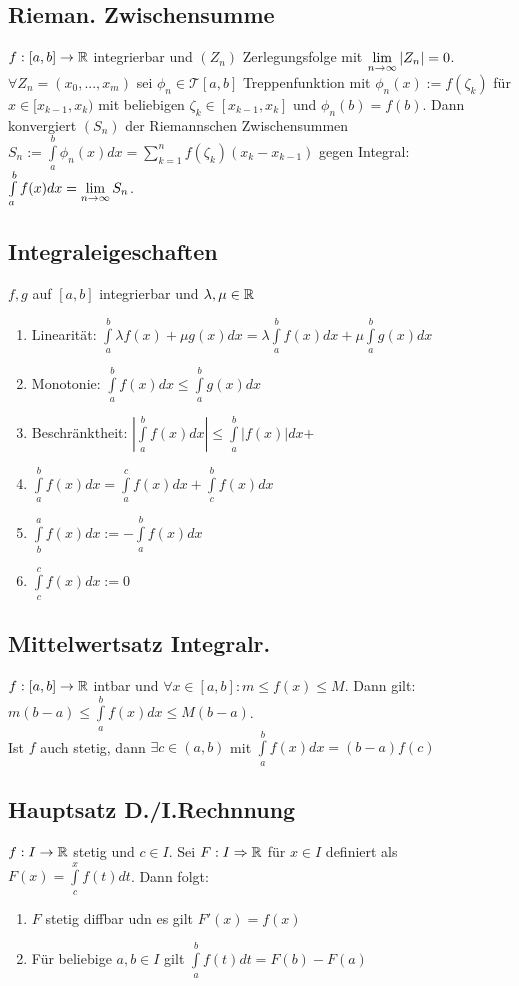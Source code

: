 \subsection*{Rieman. Zwischensumme}
$f:[a, b] \rightarrow \mathbb R$ integrierbar und $(Z_n)$ Zerlegungsfolge mit $\lim\limits_{n \rightarrow \infty} |Z_n| = 0$. $\forall Z_n = (x_0, ..., x_m)$ sei $\phi_n \in \mathcal{T}[a,b]$ Treppenfunktion mit $\phi_n(x) := f(\zeta_k)$ für $x \in [x_{k - 1}, x_k)$ mit beliebigen $\zeta_k \in [x_{k - 1}, x_k]$ und $\phi_n(b) = f(b)$. Dann konvergiert $(S_n)$ der Riemannschen Zwischensummen $S_n := \int\limits_a^b \phi_n(x) dx = \sum\limits_{k = 1}^n f(\zeta_k) (x_k - x_{k-1})$ gegen Integral: $\int\limits_{a}^b f(x) dx = \lim\limits_{n \rightarrow \infty} S_n$.
\subsection*{Integraleigeschaften}
$f, g$ auf $[a, b]$ integrierbar und $\lambda, \mu \in \mathbb R$
\begin{enumerate}[label=\alph*., noitemsep]
    \item Linearität: $\int\limits_a^b \lambda f(x) + \mu g(x) dx = \lambda\int\limits_a^b f(x) dx + \mu \int\limits_a^b g(x) dx$
    \item Monotonie: $\int\limits_a^b f(x) dx \leq \int\limits_a^b g(x) dx$
    \item Beschränktheit: $\left|\int\limits_a^b f(x) dx\right| \leq \int\limits_a^b |f(x)| dx$+
    \item $\int\limits_a^b f(x) dx = \int\limits_a^c f(x) dx + \int\limits_c^b f(x) dx$
    \item $\int\limits_b^a f(x) dx := - \int\limits_a^b f(x) dx$
    \item $\int\limits_c^c f(x) dx := 0$
\end{enumerate}
\subsection*{Mittelwertsatz Integralr.}
$f:[a, b]\rightarrow \mathbb R$ intbar und $\forall x \in [a, b]: m \leq f(x) \leq M$. Dann gilt: $m(b - a) \leq \int\limits_a^b f(x) dx \leq M(b - a)$. \\
Ist $f$ auch stetig, dann $\exists c \in (a, b)$ mit $\int\limits_a^b f(x) dx = (b - a)f(c)$
\subsection*{Hauptsatz D./I.Rechnnung}
$f: I \rightarrow \mathbb R$ stetig und $c \in I$. Sei $F: I \Rightarrow \mathbb R$ für $x \in I$ definiert als $F(x) = \int\limits_c^x f(t) dt$. Dann folgt:
\begin{enumerate}[label=\alph*., noitemsep]
    \item $F$ stetig diffbar udn es gilt $F'(x) = f(x)$
    \item Für beliebige $a, b \in I$ gilt $\int\limits_a^b f(t) dt = F(b) - F(a)$
\end{enumerate}

